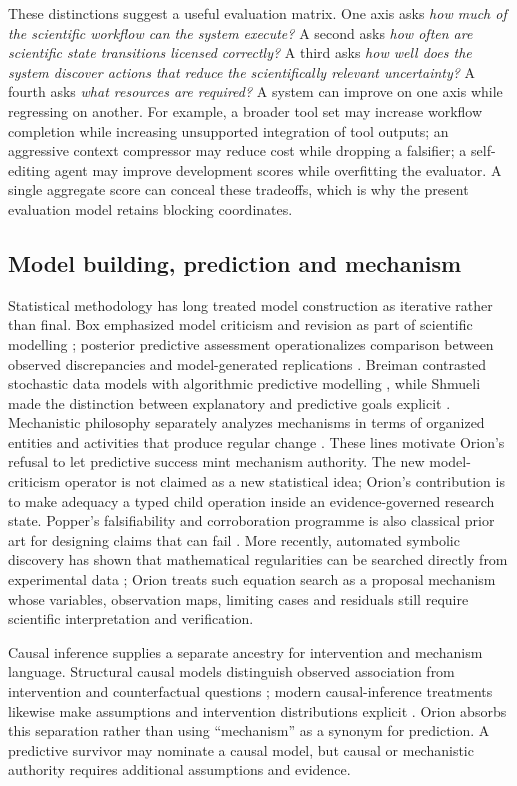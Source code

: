 These distinctions suggest a useful evaluation matrix. One axis asks \emph{how much of the scientific workflow can the system execute?} A second asks \emph{how often are scientific state transitions licensed correctly?} A third asks \emph{how well does the system discover actions that reduce the scientifically relevant uncertainty?} A fourth asks \emph{what resources are required?} A system can improve on one axis while regressing on another. For example, a broader tool set may increase workflow completion while increasing unsupported integration of tool outputs; an aggressive context compressor may reduce cost while dropping a falsifier; a self-editing agent may improve development scores while overfitting the evaluator. A single aggregate score can conceal these tradeoffs, which is why the present evaluation model retains blocking coordinates.

\subsection{Model building, prediction and mechanism}
Statistical methodology has long treated model construction as iterative rather than final. Box emphasized model criticism and revision as part of scientific modelling \cite{box1976}; posterior predictive assessment operationalizes comparison between observed discrepancies and model-generated replications \cite{gelman1996}. Breiman contrasted stochastic data models with algorithmic predictive modelling \cite{breiman2001}, while Shmueli made the distinction between explanatory and predictive goals explicit \cite{shmueli2010}. Mechanistic philosophy separately analyzes mechanisms in terms of organized entities and activities that produce regular change \cite{machamer2000}. These lines motivate Orion's refusal to let predictive success mint mechanism authority. The new model-criticism operator is not claimed as a new statistical idea; Orion's contribution is to make adequacy a typed child operation inside an evidence-governed research state. Popper's falsifiability and corroboration programme is also classical prior art for designing claims that can fail \cite{popper1959}. More recently, automated symbolic discovery has shown that mathematical regularities can be searched directly from experimental data \cite{schmidt2009}; Orion treats such equation search as a proposal mechanism whose variables, observation maps, limiting cases and residuals still require scientific interpretation and verification.

Causal inference supplies a separate ancestry for intervention and mechanism language. Structural causal models distinguish observed association from intervention and counterfactual questions \cite{pearl2009}; modern causal-inference treatments likewise make assumptions and intervention distributions explicit \cite{peters2017}. Orion absorbs this separation rather than using ``mechanism'' as a synonym for prediction. A predictive survivor may nominate a causal model, but causal or mechanistic authority requires additional assumptions and evidence.

